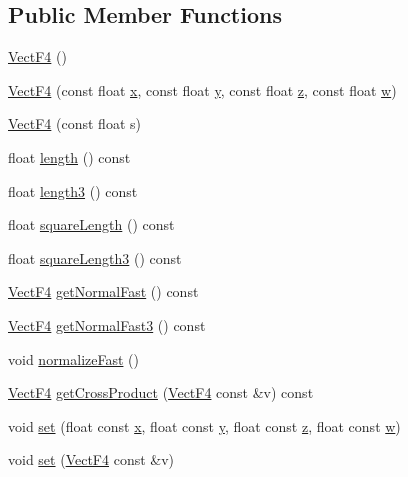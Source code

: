 \subsection*{Public Member Functions}
\begin{DoxyCompactItemize}
\item 
\hyperlink{classVectF4_a235f6776a91a02a2dace53cd629e7703}{Vect\-F4} ()
\item 
\hyperlink{classVectF4_afb95825981cdf990e37ce4e1d0125788}{Vect\-F4} (const float \hyperlink{classVectF4_a0eae0277b6f418b6455a45030824c271}{x}, const float \hyperlink{classVectF4_a9c3f2f0998e49e2039768ce8e64c1f91}{y}, const float \hyperlink{classVectF4_a7fd880f9637591664713a14796cc06cd}{z}, const float \hyperlink{classVectF4_a9e59fa7a69f80b5af58c3bf358ba7b4a}{w})
\item 
\hyperlink{classVectF4_a0499a266eef4fa39519e944ba46c6f04}{Vect\-F4} (const float s)
\item 
float \hyperlink{classVectF4_a937bf8ee5a421916da1d2f931ba61169}{length} () const 
\item 
float \hyperlink{classVectF4_a3be97ec242609adc371ec725ea818da1}{length3} () const 
\item 
float \hyperlink{classVectF4_af91e0e8c45ec70a51b860c8cbbf5228e}{square\-Length} () const 
\item 
float \hyperlink{classVectF4_a96b0edfd9396793949d1895d43242107}{square\-Length3} () const 
\item 
\hyperlink{classVectF4}{Vect\-F4} \hyperlink{classVectF4_a8076a96bfdf1fee2b9423b052210e292}{get\-Normal\-Fast} () const 
\item 
\hyperlink{classVectF4}{Vect\-F4} \hyperlink{classVectF4_a768f83dc5a9fe225714de353d8eb2e60}{get\-Normal\-Fast3} () const 
\item 
void \hyperlink{classVectF4_a2c9ca2d1c14e440da8c23fb4c452a45b}{normalize\-Fast} ()
\item 
\hyperlink{classVectF4}{Vect\-F4} \hyperlink{classVectF4_a5ad1890ee8d70848b15457d709033fee}{get\-Cross\-Product} (\hyperlink{classVectF4}{Vect\-F4} const \&v) const 
\item 
void \hyperlink{classVectF4_a1f10b37c63e3d7f163f059cc31215dbe}{set} (float const \hyperlink{classVectF4_a0eae0277b6f418b6455a45030824c271}{x}, float const \hyperlink{classVectF4_a9c3f2f0998e49e2039768ce8e64c1f91}{y}, float const \hyperlink{classVectF4_a7fd880f9637591664713a14796cc06cd}{z}, float const \hyperlink{classVectF4_a9e59fa7a69f80b5af58c3bf358ba7b4a}{w})
\item 
void \hyperlink{classVectF4_ac077f0ffa0fbfdfdd6b6f6a2d4a9fa46}{set} (\hyperlink{classVectF4}{Vect\-F4} const \&v)

\end{DoxyCompactItemize}
